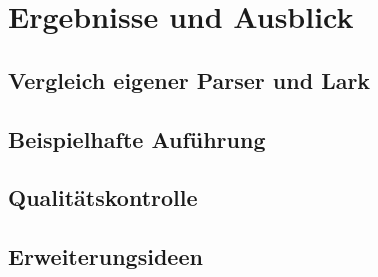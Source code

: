 \documentclass{scrreprt}
\begin{document}
  \chapter{Ergebnisse und Ausblick}
  \section{Vergleich eigener Parser und Lark}
  \section{Beispielhafte Auführung}
  \section{Qualitätskontrolle}
  \section{Erweiterungsideen}
  \lipsum
\end{document}

